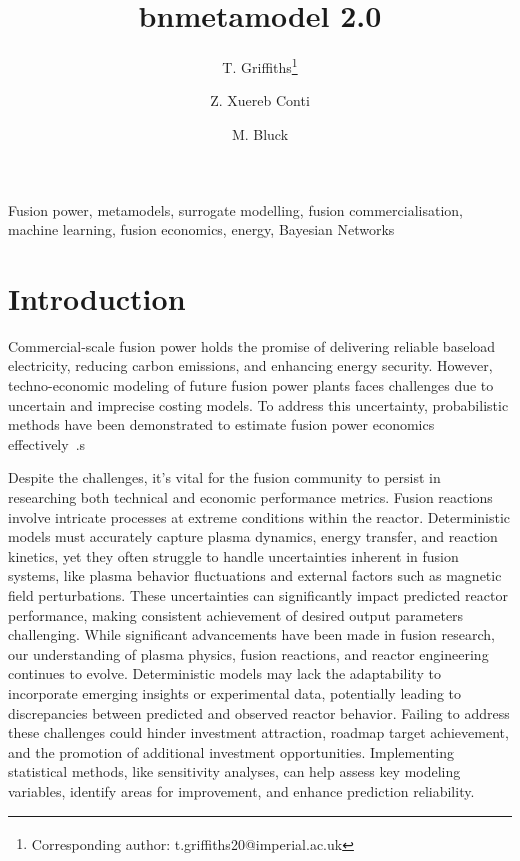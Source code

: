 \documentclass[journal]{IEEEtran}
\begin{document}
\title{bnmetamodel 2.0}

\author[1]{T. Griffiths\thanks{\textsuperscript{\Cross}Corresponding author: t.griffiths20@imperial.ac.uk}}
\author[2]{Z. Xuereb Conti}
\author[1]{M. Bluck}

\vspace{-15pt}

\maketitle

\begin{abstract}

\end{abstract}

\begin{IEEEkeywords}
Fusion power, metamodels, surrogate modelling, fusion commercialisation, machine learning, fusion economics, energy, Bayesian Networks
\end{IEEEkeywords}
\vspace{-2ex}

\section{Introduction}

Commercial-scale fusion power holds the promise of delivering reliable baseload electricity, reducing carbon emissions, and enhancing energy security. However, techno-economic modeling of future fusion power plants faces challenges due to uncertain and imprecise costing models. To address this uncertainty, probabilistic methods have been demonstrated to estimate fusion power economics effectively~\cite{Griffiths2024}.s

Despite the challenges, it's vital for the fusion community to persist in researching both technical and economic performance metrics. Fusion reactions involve intricate processes at extreme conditions within the reactor. Deterministic models must accurately capture plasma dynamics, energy transfer, and reaction kinetics, yet they often struggle to handle uncertainties inherent in fusion systems, like plasma behavior fluctuations and external factors such as magnetic field perturbations. These uncertainties can significantly impact predicted reactor performance, making consistent achievement of desired output parameters challenging. While significant advancements have been made in fusion research, our understanding of plasma physics, fusion reactions, and reactor engineering continues to evolve. Deterministic models may lack the adaptability to incorporate emerging insights or experimental data, potentially leading to discrepancies between predicted and observed reactor behavior. Failing to address these challenges could hinder investment attraction, roadmap target achievement, and the promotion of additional investment opportunities. Implementing statistical methods, like sensitivity analyses, can help assess key modeling variables, identify areas for improvement, and enhance prediction reliability.
\end{document}
